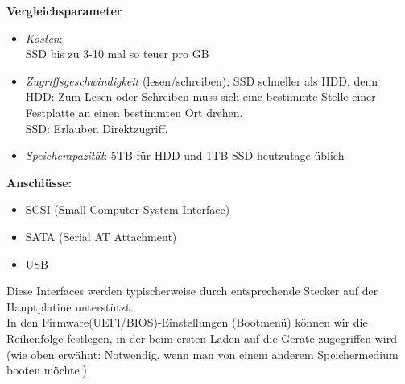 \textbf{Vergleichsparameter}
\begin{itemize}
	\item \textit{Kosten}:\\
	SSD bis zu 3-10 mal so teuer pro GB
	\item \textit{Zugriffsgeschwindigkeit} (lesen/schreiben): SSD schneller als HDD, denn\\
	 HDD: Zum Lesen oder Schreiben muss sich eine bestimmte Stelle einer Festplatte an einen bestimmten Ort drehen.\\
	 SSD: Erlauben Direktzugriff.
	\item \textit{Speicherapazität}: 5TB für HDD und 1TB SSD heutzutage üblich\\
\end{itemize}
\textbf{Anschlüsse:}
\begin{itemize}
	\item SCSI (Small Computer System Interface)
	\item SATA (Serial AT Attachment)
	\item USB
\end{itemize}
Diese Interfaces werden typischerweise durch entsprechende Stecker auf der Hauptplatine unterstützt.\\
In den Firmware(UEFI/BIOS)-Einstellungen (Bootmenü) können wir die Reihenfolge festlegen, in der beim ersten Laden auf die Geräte zugegriffen wird (wie oben erwähnt: Notwendig, wenn man von einem anderem Speichermedium booten möchte.)
~\\


